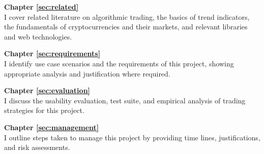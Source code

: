 \noindent\textbf{Chapter \ref{sec:related}} \\[0.2em]
I cover related literature on algorithmic trading, the basics of trend indicators, the fundamentals of cryptocurrencies and their markets, and relevant libraries and web technologies.

\noindent\textbf{Chapter \ref{sec:requirements}} \\[0.2em]
I identify use case scenarios and the requirements of this project, showing appropriate analysis and justification where required.


\noindent\textbf{Chapter \ref{sec:evaluation}} \\[0.2em]
I discuss the usability evaluation, test suite, and empirical analysis of trading strategies for this project.

\noindent\textbf{Chapter \ref{sec:management}} \\[0.2em]
I outline steps taken to manage this project by providing time lines, justifications, and risk assessments.